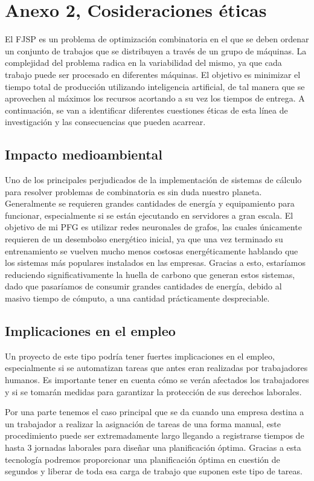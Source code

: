 \section{Anexo 2, Cosideraciones éticas}
El FJSP es un problema de optimización combinatoria en el que se deben ordenar un 
conjunto de trabajos que se distribuyen a través de un grupo de máquinas. La 
complejidad del problema radica en la variabilidad del mismo, ya que cada trabajo 
puede ser procesado en diferentes máquinas. El objetivo es minimizar el tiempo 
total de producción utilizando inteligencia artificial, de tal manera que se 
aprovechen al máximos los recursos acortando a su vez los tiempos de entrega. A 
continuación, se van a identificar diferentes cuestiones éticas de esta línea de 
investigación y las consecuencias que pueden acarrear.

\subsection{Impacto medioambiental}
Uno de los principales perjudicados de la implementación de sistemas de cálculo 
para resolver problemas de combinatoria es sin duda nuestro planeta. Generalmente 
se requieren grandes cantidades de energía y equipamiento para funcionar, 
especialmente si se están ejecutando en servidores a gran escala. El objetivo de 
mi PFG es utilizar redes neuronales de grafos, las cuales únicamente requieren de 
un desembolso energético inicial, ya que una vez terminado su entrenamiento se 
vuelven mucho menos costosas energéticamente hablando que los sistemas más populares 
instalados en las empresas. Gracias a esto, estaríamos reduciendo significativamente 
la huella de carbono que generan estos sistemas, dado que pasaríamos de consumir 
grandes cantidades de energía, debido al masivo tiempo de cómputo, a una cantidad 
prácticamente despreciable.

\subsection{Implicaciones en el empleo}
Un proyecto de este tipo podría tener fuertes implicaciones en el empleo, especialmente 
si se automatizan tareas que antes eran realizadas por trabajadores humanos. Es 
importante tener en cuenta cómo se verán afectados los trabajadores y si se tomarán 
medidas para garantizar la protección de sus derechos laborales.\medskip

Por una parte tenemos el caso principal que se da cuando una empresa destina a un 
trabajador a realizar la asignación de tareas de una forma manual, este procedimiento 
puede ser extremadamente largo llegando a registrarse tiempos de hasta 3 jornadas 
laborales para diseñar una planificación óptima. Gracias a esta tecnología podremos 
proporcionar una planificación óptima en cuestión de segundos y liberar de toda esa 
carga de trabajo que suponen este tipo de tareas.\medskip

